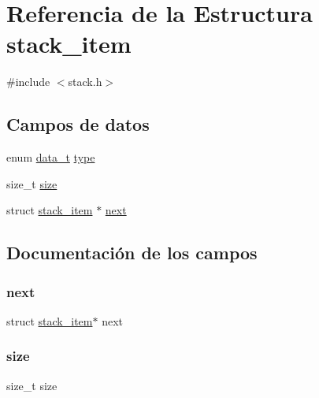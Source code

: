 \hypertarget{structstack__item}{}\section{Referencia de la Estructura stack\+\_\+item}
\label{structstack__item}


{\ttfamily \#include $<$stack.\+h$>$}

\subsection*{Campos de datos}
\begin{DoxyCompactItemize}
\item 
enum \mbox{\hyperlink{hashtable_8h_adb5f3584b941a8dc0fed6b7302b4b8eb}{data\+\_\+t}} \mbox{\hyperlink{structstack__item_a0c6169f5c94682132bbbe974784559e6}{type}}
\item 
size\+\_\+t \mbox{\hyperlink{structstack__item_a854352f53b148adc24983a58a1866d66}{size}}
\item 
struct \mbox{\hyperlink{structstack__item}{stack\+\_\+item}} $\ast$ \mbox{\hyperlink{structstack__item_a0bd53e44edb84db0a4f76ab6d57b7a18}{next}}
\end{DoxyCompactItemize}


\subsection{Documentación de los campos}
\mbox{\label{structstack__item_a0bd53e44edb84db0a4f76ab6d57b7a18}} 
\subsubsection{\texorpdfstring{next}{next}}
{\footnotesize\ttfamily struct \mbox{\hyperlink{structstack__item}{stack\+\_\+item}}$\ast$ next}

\mbox{\label{structstack__item_a854352f53b148adc24983a58a1866d66}} 
\subsubsection{\texorpdfstring{size}{size}}
{\footnotesize\ttfamily size\+\_\+t size}

